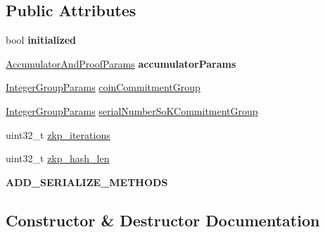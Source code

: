 \subsection*{Public Attributes}
\begin{DoxyCompactItemize}
\item 
\mbox{\label{classlibzerocoin_1_1_zerocoin_params_aef4cd7f30006de8958807457bfd905cc}} 
bool {\bfseries initialized}
\item 
\mbox{\label{classlibzerocoin_1_1_zerocoin_params_a56681302f7f55802c58499092d7399a8}} 
\mbox{\hyperlink{classlibzerocoin_1_1_accumulator_and_proof_params}{Accumulator\+And\+Proof\+Params}} {\bfseries accumulator\+Params}
\item 
\mbox{\hyperlink{classlibzerocoin_1_1_integer_group_params}{Integer\+Group\+Params}} \mbox{\hyperlink{classlibzerocoin_1_1_zerocoin_params_a4d3f02e31698e16f5edd844d3edc4b35}{coin\+Commitment\+Group}}
\item 
\mbox{\hyperlink{classlibzerocoin_1_1_integer_group_params}{Integer\+Group\+Params}} \mbox{\hyperlink{classlibzerocoin_1_1_zerocoin_params_a6360b02f49690260136fe79d85914dcc}{serial\+Number\+So\+K\+Commitment\+Group}}
\item 
uint32\+\_\+t \mbox{\hyperlink{classlibzerocoin_1_1_zerocoin_params_a9bdd86029187d93275c5362ff858b81c}{zkp\+\_\+iterations}}
\item 
uint32\+\_\+t \mbox{\hyperlink{classlibzerocoin_1_1_zerocoin_params_a76d6a2e590469d3e07200aa0f4b5ddef}{zkp\+\_\+hash\+\_\+len}}
\item 
\mbox{\label{classlibzerocoin_1_1_zerocoin_params_a3bbd50045b8bb01a4b7a469faf7af784}} 
{\bfseries A\+D\+D\+\_\+\+S\+E\+R\+I\+A\+L\+I\+Z\+E\+\_\+\+M\+E\+T\+H\+O\+DS}
\end{DoxyCompactItemize}


\subsection{Constructor \& Destructor Documentation}
\mbox{\label{classlibzerocoin_1_1_zerocoin_params_ad7abfc8417e3f07feb7b786cb13c72b0}} 
